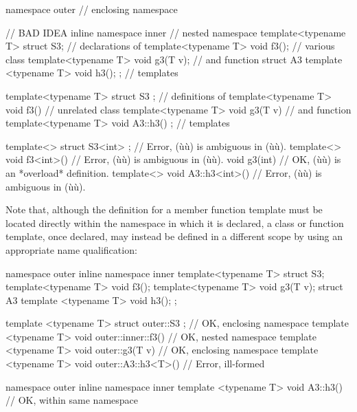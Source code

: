 \begin{emcppslisting}[emcppsbatch=e8]
namespace outer                                          // enclosing namespace
{                                                        // BAD IDEA
    inline namespace inner                               // nested namespace
    {
        template<typename T> struct S3;                  // declarations of
        template<typename T> void f3();                  // various class
        template<typename T> void g3(T v);               // and function
        struct A3 { template <typename T> void h3(); };  // templates
    }

    template<typename T> struct S3 { };                  // definitions of
    template<typename T> void f3() { }                   // unrelated class
    template<typename T> void g3(T v) { }                // and function
    template<typename T> void A3::h3() { };              // templates

    template<> struct S3<int> { };     // Error, (ù{}ù) is ambiguous in (ù{}ù).
    template<> void f3<int>() { }      // Error, (ù{}ù) is ambiguous in (ù{}ù).
    void g3(int) { }                   // OK, (ù{}ù) is an *overload* definition.
    template<> void A3::h3<int>() { }  // Error, (ù{}ù) is ambiguous in (ù{}ù).
}
\end{emcppslisting}

\noindent Note that, although the definition for a member function template must
be located directly within the namespace in which it is declared, a
class or function template, once declared, may instead be defined in a different
scope by using an appropriate name qualification:

\begin{emcppshiddenlisting}[emcppsbatch=e9]
namespace outer
{
    inline namespace inner
    {
        template<typename T> struct S3;
        template<typename T> void f3();
        template<typename T> void g3(T v);
        struct A3 { template <typename T> void h3(); };
    }
}
\end{emcppshiddenlisting}
\begin{emcppslisting}[emcppsbatch=e9]
template <typename T> struct outer::S3 { };        // OK, enclosing namespace
template <typename T> void outer::inner::f3() { }  // OK, nested namespace
template <typename T> void outer::g3(T v) { }      // OK, enclosing namespace
template <typename T> void outer::A3::h3<T>() { }  // Error, ill-formed

namespace outer
{
    inline namespace inner
    {
        template <typename T> void A3::h3() { }    // OK, within same namespace
    }
}
\end{emcppslisting}

